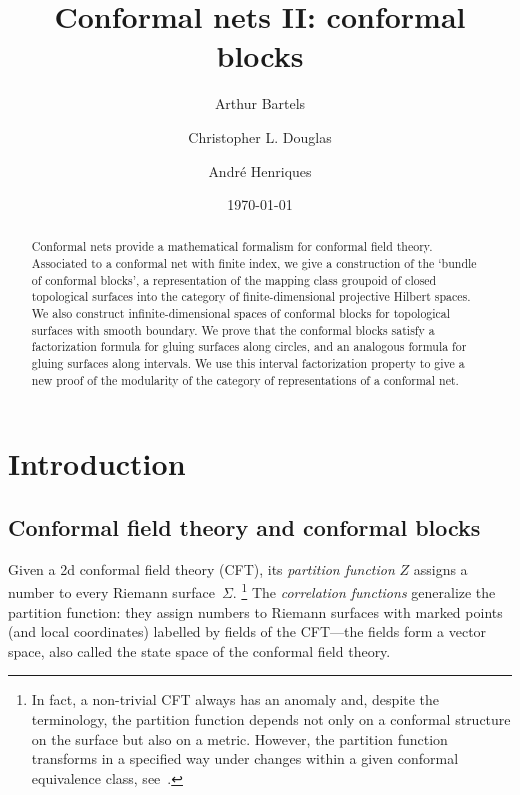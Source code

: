 \documentclass[a4paper,10pt,leqno]{amsart}
\title{Conformal nets II: conformal blocks}
\author{Arthur Bartels}
\author{Christopher L. Douglas}
\author{Andr{\'e} Henriques}
\date{\today}
\theoremstyle{plain}
\theoremstyle{definition}
\theoremstyle{remark}
\DeclareRobustCommand{\SkipTocEntry}[5]{}
\begin{document}
	\begin{abstract} 
Conformal nets provide a mathematical formalism for conformal field theory.  Associated to a conformal net with finite index, we give a construction of the `bundle of conformal blocks', a representation of the mapping class groupoid of closed topological surfaces into the category of finite-dimensional projective Hilbert spaces.  We also construct infinite-dimensional spaces of conformal blocks for topological surfaces with smooth boundary.  We prove that the conformal blocks satisfy a factorization formula for gluing surfaces along circles, and an analogous formula for gluing surfaces along intervals.  We use this interval factorization property to give a new proof of the modularity of the category of representations of a conformal net.
	\end{abstract}



\date{}
\maketitle
\tableofcontents


\newcommand{\comment}[1]{}
\comment{
}



\section*{Introduction}
\subsection*{Conformal field theory and conformal blocks}
Given a 2d conformal field theory (CFT), its \emph{partition function} $Z$ assigns a number to every Riemann surface~$\Sigma$.%
\footnote{In fact, a non-trivial CFT always has an anomaly and, despite the terminology, the partition function depends not only on a conformal structure on the surface but also on a metric.
However, the partition function transforms in a specified way under changes within a given conformal equivalence class, see~\cite[Sec.3]{Friedan-Shenker(The-analytic-geometry-of-two-dimensional-conformal-field-theory)}.}
The \emph{correlation functions} generalize the partition function:
they assign numbers to Riemann surfaces with marked points (and local coordinates) labelled by fields of the CFT---the fields form a vector space, also called the state space of the conformal field theory.
\end{document}
